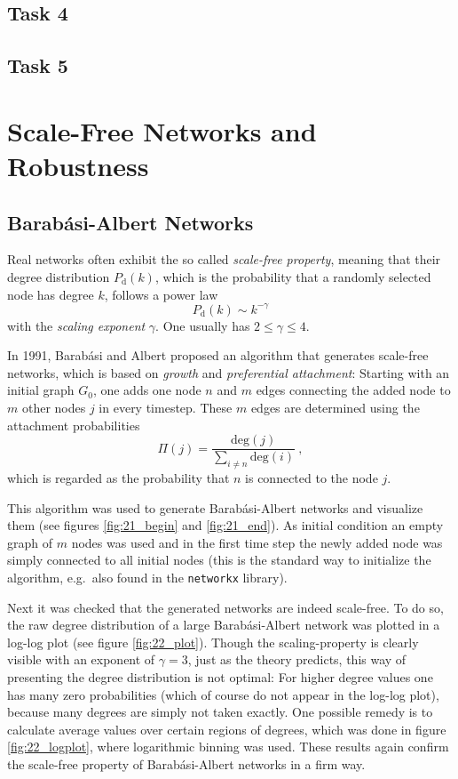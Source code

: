 \documentclass{scrartcl}
\begin{document}
\subsection{Task 4}
\subsection{Task 5}

\clearpage
\section{Scale-Free Networks and Robustness}
\subsection{Barab\'asi-Albert Networks}
Real networks often exhibit the so called \emph{scale-free property},
meaning that their degree distribution $P_\mathrm{d}(k)$, which is the probability
that a randomly selected node has degree $k$, follows a power law
\begin{equation}
    P_\mathrm{d}(k) \sim k^{-\gamma}
\end{equation}
with the \emph{scaling exponent} $\gamma$. One usually has $2 \le \gamma \le 4$.

In 1991, Barab\'asi and Albert proposed an algorithm that generates
scale-free networks, which is based on \emph{growth} and \emph{preferential
attachment}: Starting with an initial graph $G_0$, one adds one node $n$ and
$m$ edges connecting the added node to $m$ other nodes $j$ in every timestep.
These $m$ edges are determined using the attachment probabilities
\begin{equation}
    \Pi(j) = \frac{\mathrm{deg}(j)}{\sum_{i\neq n} \mathrm{deg}(i)}~,
\end{equation}
which is regarded as the probability that $n$ is connected to the node $j$.

 This algorithm was used to generate Barab\'asi-Albert
networks and visualize them (see figures \ref{fig:21_begin} and \ref{fig:21_end}).
As initial condition an empty graph of $m$ nodes was used and in the first
time step the newly added node was simply connected to all initial nodes
(this is the standard way to initialize the algorithm, e.g.\ also found in
the \texttt{networkx} library).

 Next it was checked that the generated networks are indeed scale-free.
To do so, the raw degree distribution of a large Barab\'asi-Albert network
was plotted in a log-log plot (see figure \ref{fig:22_plot}). Though the
scaling-property is clearly visible with an exponent of $\gamma = 3$, just
as the theory predicts, this way of presenting the degree distribution is
not optimal: For higher degree values one has many zero probabilities
(which of course do not appear in the log-log plot), because many degrees are
simply not taken exactly. One possible remedy is to calculate average
values over certain regions of degrees, which was done in figure
\ref{fig:22_logplot}, where logarithmic binning was used. These results
again confirm the scale-free property of Barab\'asi-Albert networks in a firm way.
\end{document}
